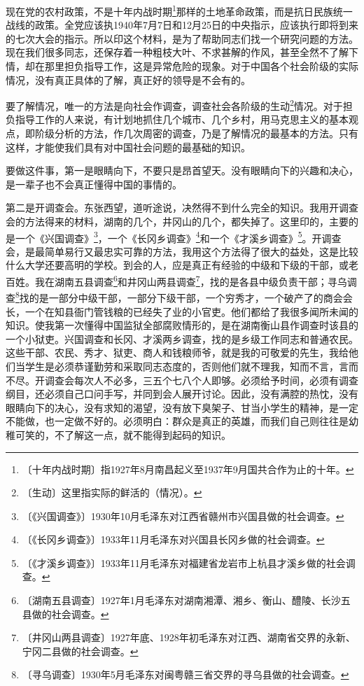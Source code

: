 \documentclass[12pt,UTF-8,openany]{ctexbook}
\begin{document}
\begin{normalsize}
    
    现在党的农村政策，不是十年内战时期\footnote{〔十年内战时期〕指1927年8月南昌起义至1937年9月国共合作为止的十年。}那样的土地革命政策，而是抗日民族统一战线的政策。全党应该执1940年7月7日和12月25日的中央指示，应该执行即将到来的七次大会的指示。所以印这个材料，是为了帮助同志们找一个研究问题的方法。现在我们很多同志，还保存着一种粗枝大叶、不求甚解的作风，甚至全然不了解下情，却在那里担负指导工作，这是异常危险的现象。对于中国各个社会阶级的实际情况，没有真正具体的了解，真正好的领导是不会有的。
    
    要了解情况，唯一的方法是向社会作调查，调查社会各阶级的生动\footnote{〔生动〕这里指实际的鲜活的（情况）。}情况。对于担负指导工作的人来说，有计划地抓住几个城市、几个乡村，用马克思主义的基本观点，即阶级分析的方法，作几次周密的调查，乃是了解情况的最基本的方法。只有这样，才能使我们具有对中国社会问题的最基础的知识。
    
    要做这件事，第一是眼睛向下，不要只是昂首望天。没有眼睛向下的兴趣和决心，是一辈子也不会真正懂得中国的事情的。
    
    第二是开调查会。东张西望，道听途说，决然得不到什么完全的知识。我用开调查会的方法得来的材料，湖南的几个，井冈山的几个，都失掉了。这里印的，主要的是一个《兴国调查》\footnote{〔《兴国调查》〕1930年10月毛泽东对江西省赣州市兴国县做的社会调查。}，一个《长冈乡调查》\footnote{〔《长冈乡调查》〕1933年11月毛泽东对兴国县长冈乡做的社会调查。}和一个《才溪乡调查》\footnote{〔《才溪乡调查》〕1933年11月毛泽东对福建省龙岩市上杭县才溪乡做的社会调查。}。开调查会，是最简单易行又最忠实可靠的方法，我用这个方法得了很大的益处，这是比较什么大学还要高明的学校。到会的人，应是真正有经验的中级和下级的干部，或老百姓。我在湖南五县调查\footnote{〔湖南五县调查〕1927年1月毛泽东对湖南湘潭、湘乡、衡山、醴陵、长沙五县做的社会调查。}和井冈山两县调查\footnote{〔井冈山两县调查〕1927年底、1928年初毛泽东对江西、湖南省交界的永新、宁冈二县做的社会调查。}，找的是各县中级负责干部；寻乌调查\footnote{〔寻乌调查〕1930年5月毛泽东对闽粤赣三省交界的寻乌县做的社会调查。}找的是一部分中级干部，一部分下级干部，一个穷秀才，一个破产了的商会会长，一个在知县衙门管钱粮的已经失了业的小官吏。他们都给了我很多闻所未闻的知识。使我第一次懂得中国监狱全部腐败情形的，是在湖南衡山县作调查时该县的一个小狱吏。兴国调查和长冈、才溪两乡调查，找的是乡级工作同志和普通农民。这些干部、农民、秀才、狱吏、商人和钱粮师爷，就是我的可敬爱的先生，我给他们当学生是必须恭谨勤劳和采取同志态度的，否则他们就不理我，知而不言，言而不尽。开调查会每次人不必多，三五个七八个人即够。必须给予时间，必须有调查纲目，还必须自己口问手写，并同到会人展开讨论。因此，没有满腔的热忱，没有眼睛向下的决心，没有求知的渴望，没有放下臭架子、甘当小学生的精神，是一定不能做，也一定做不好的。必须明白：群众是真正的英雄，而我们自己则往往是幼稚可笑的，不了解这一点，就不能得到起码的知识。
    

\end{normalsize}
\end{document}
